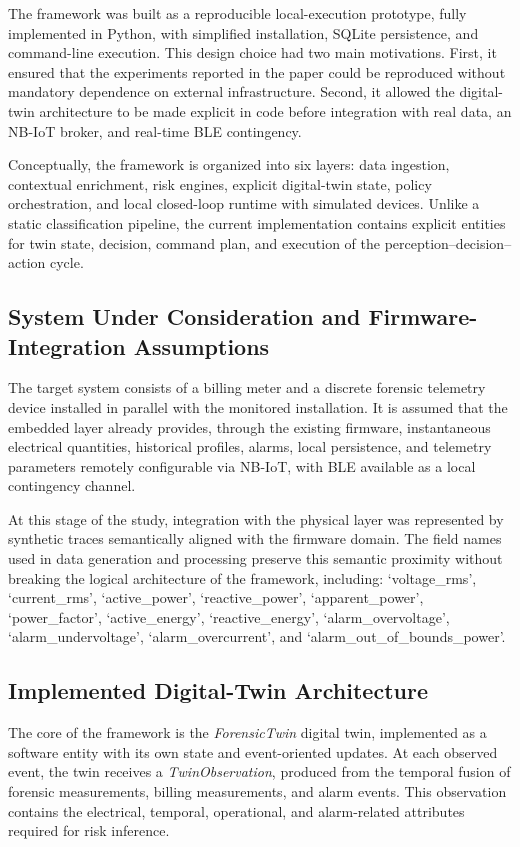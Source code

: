 \documentclass[journal]{IEEEtran}
\begin{document}
The framework was built as a reproducible local-execution prototype, fully implemented in Python, with simplified installation, SQLite persistence, and command-line execution. This design choice had two main motivations. First, it ensured that the experiments reported in the paper could be reproduced without mandatory dependence on external infrastructure. Second, it allowed the digital-twin architecture to be made explicit in code before integration with real data, an NB-IoT broker, and real-time BLE contingency.

Conceptually, the framework is organized into six layers: data ingestion, contextual enrichment, risk engines, explicit digital-twin state, policy orchestration, and local closed-loop runtime with simulated devices. Unlike a static classification pipeline, the current implementation contains explicit entities for twin state, decision, command plan, and execution of the perception--decision--action cycle.


\subsection{System Under Consideration and Firmware-Integration Assumptions}
The target system consists of a billing meter and a discrete forensic telemetry device installed in parallel with the monitored installation. It is assumed that the embedded layer already provides, through the existing firmware, instantaneous electrical quantities, historical profiles, alarms, local persistence, and telemetry parameters remotely configurable via NB-IoT, with BLE available as a local contingency channel.

At this stage of the study, integration with the physical layer was represented by synthetic traces semantically aligned with the firmware domain. The field names used in data generation and processing preserve this semantic proximity without breaking the logical architecture of the framework, including: `voltage\_rms', `current\_rms', `active\_power', `reactive\_power', `apparent\_power', `power\_factor', `active\_energy', `reactive\_energy', `alarm\_overvoltage', `alarm\_undervoltage', `alarm\_overcurrent', and `alarm\_out\_of\_bounds\_power'.


\subsection{Implemented Digital-Twin Architecture}
The core of the framework is the \textit{ForensicTwin} digital twin, implemented as a software entity with its own state and event-oriented updates. At each observed event, the twin receives a \textit{TwinObservation}, produced from the temporal fusion of forensic measurements, billing measurements, and alarm events. This observation contains the electrical, temporal, operational, and alarm-related attributes required for risk inference.
\end{document}
